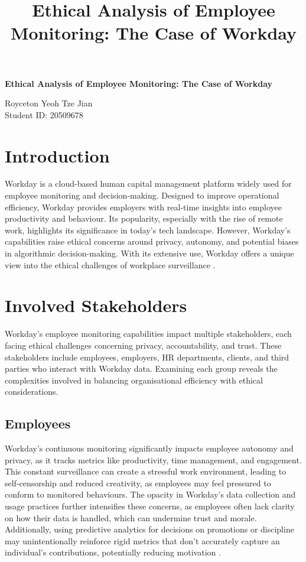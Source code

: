 \documentclass[a4paper]{article}
\title{\textbf{Ethical Analysis of Employee Monitoring: The Case of Workday}}
\author{}
\date{}
\begin{document}
\begin{titlepage}
    \centering
    \vspace*{\fill} %
    \Huge
    \textbf{Ethical Analysis of Employee Monitoring: The Case of Workday}

    \vspace{1.5cm}
    \LARGE
    Royceton Yeoh Tze Jian \\
    Student ID: 20509678

    \vspace*{\fill} %
\end{titlepage}

\thispagestyle{fancy}
\pagestyle{fancy}

\newpage
\tableofcontents
\newpage

\section{Introduction}
Workday is a cloud-based human capital management platform widely used for employee monitoring and decision-making. Designed to improve operational efficiency, Workday provides employers with real-time insights into employee productivity and behaviour. Its popularity, especially with the rise of remote work, highlights its significance in today’s tech landscape. However, Workday’s capabilities raise ethical concerns around privacy, autonomy, and potential biases in algorithmic decision-making. With its extensive use, Workday offers a unique view into the ethical challenges of workplace surveillance \citep{Ajunwa2017, Zuboff2019}.

\section{Involved Stakeholders}
Workday’s employee monitoring capabilities impact multiple stakeholders, each facing ethical challenges concerning privacy, accountability, and trust. These stakeholders include employees, employers, HR departments, clients, and third parties who interact with Workday data. Examining each group reveals the complexities involved in balancing organisational efficiency with ethical considerations.

\subsection{Employees}
Workday’s continuous monitoring significantly impacts employee autonomy and privacy, as it tracks metrics like productivity, time management, and engagement. This constant surveillance can create a stressful work environment, leading to self-censorship and reduced creativity, as employees may feel pressured to conform to monitored behaviours. The opacity in Workday’s data collection and usage practices further intensifies these concerns, as employees often lack clarity on how their data is handled, which can undermine trust and morale. Additionally, using predictive analytics for decisions on promotions or discipline may unintentionally reinforce rigid metrics that don’t accurately capture an individual’s contributions, potentially reducing motivation \citep{Moore2018, Gerten2019}.
\end{document}
